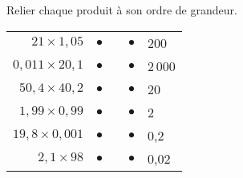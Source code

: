 \begin{exercice*}
   Relier chaque produit à son ordre de grandeur.
   \begin{tabular}{rcp{2cm}cp{2cm}}
      $21\times1,05$ & $\bullet$ & & $\bullet$ & 200 \\
      $0,011\times20,1$ & $\bullet$ & & $\bullet$ & 2\,000 \\
      $50,4\times40,2$ & $\bullet$ & & $\bullet$ & 20 \\
      $1,99\times0,99$ & $\bullet$ & & $\bullet$ & 2 \\
      $19,8\times0,001$ & $\bullet$ & & $\bullet$ & 0,2 \\
      $2,1\times98$ & $\bullet$ & & $\bullet$ & 0,02 \\
   \end{tabular}
 \end{exercice*}
 